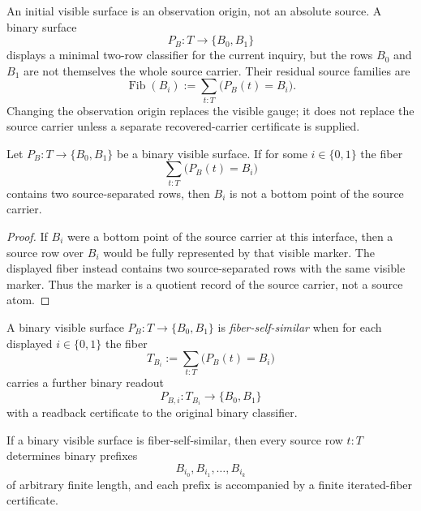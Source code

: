 \begin{principle}
\label{prin:visible-origins-are-gauges}
An initial visible surface is an observation origin, not an absolute
source. A binary surface
$$
P_B:T\to\{B_0,B_1\}
$$
displays a minimal two-row classifier for the current inquiry, but the
rows $B_0$ and $B_1$ are not themselves the whole source carrier. Their
residual source families are
$$
\operatorname{Fib}(B_i)
:=
\sum_{t:T}\bigl(P_B(t)=B_i\bigr).
$$
Changing the observation origin replaces the visible gauge; it does not
replace the source carrier unless a separate recovered-carrier
certificate is supplied.
\end{principle}

\begin{theorem}
\label{thm:binary-visible-rows-not-bottom-points}
Let $P_B:T\to\{B_0,B_1\}$ be a binary visible surface. If for some
$i\in\{0,1\}$ the fiber
$$
\sum_{t:T}\bigl(P_B(t)=B_i\bigr)
$$
contains two source-separated rows, then $B_i$ is not a bottom point of
the source carrier.
\end{theorem}

\begin{proof}
If $B_i$ were a bottom point of the source carrier at this interface,
then a source row over $B_i$ would be fully represented by that visible
marker. The displayed fiber instead contains two source-separated rows
with the same visible marker. Thus the marker is a quotient record of
the source carrier, not a source atom.
\end{proof}

\begin{definition}
\label{def:binary-fiber-self-similarity}
A binary visible surface $P_B:T\to\{B_0,B_1\}$ is
\emph{fiber-self-similar} when for each displayed $i\in\{0,1\}$ the
fiber
$$
T_{B_i}:=\sum_{t:T}\bigl(P_B(t)=B_i\bigr)
$$
carries a further binary readout
$$
P_{B,i}:T_{B_i}\to\{B_0,B_1\}
$$
with a readback certificate to the original binary classifier.
\end{definition}

\begin{theorem}
\label{thm:binary-fiber-self-similarity-finite-path-certificates}
If a binary visible surface is fiber-self-similar, then every source row
$t:T$ determines binary prefixes
$$
B_{i_0},B_{i_1},\ldots,B_{i_k}
$$
of arbitrary finite length, and each prefix is accompanied by a finite
iterated-fiber certificate.
\end{theorem}

